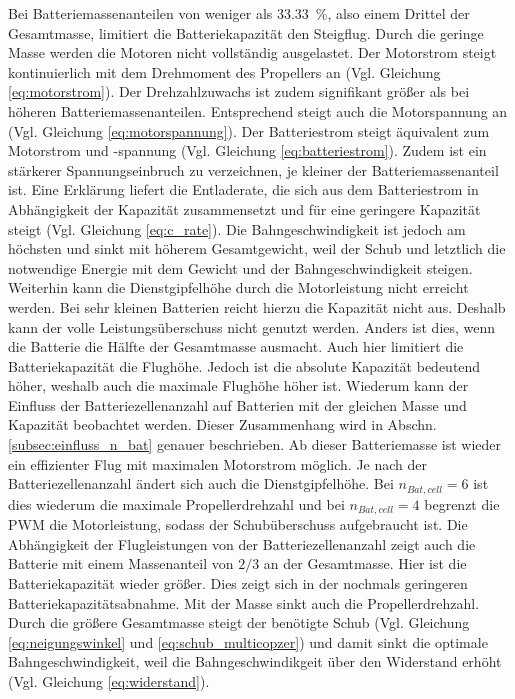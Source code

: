 Bei Batteriemassenanteilen von weniger als \SI{33,33}{\%}, also einem Drittel der Gesamtmasse, limitiert die Batteriekapazität den Steigflug. Durch die geringe Masse werden die Motoren nicht vollständig ausgelastet. Der Motorstrom steigt kontinuierlich mit dem Drehmoment des Propellers an (Vgl. Gleichung \ref{eq:motorstrom}). Der Drehzahlzuwachs ist zudem signifikant größer als bei höheren Batteriemassenanteilen. Entsprechend steigt auch die Motorspannung an (Vgl. Gleichung \ref{eq:motorspannung}). Der Batteriestrom steigt äquivalent zum Motorstrom und -spannung (Vgl. Gleichung \ref{eq:batteriestrom}).
Zudem ist ein stärkerer Spannungseinbruch zu verzeichnen, je kleiner der Batteriemassenanteil ist. Eine Erklärung liefert die Entladerate, die sich aus dem Batteriestrom in Abhängigkeit der Kapazität zusammensetzt und für eine geringere Kapazität steigt (Vgl. Gleichung \ref{eq:c_rate}). Die Bahngeschwindigkeit ist jedoch am höchsten und sinkt mit höherem Gesamtgewicht, weil der Schub und letztlich die notwendige Energie mit dem Gewicht und der Bahngeschwindigkeit steigen. 
Weiterhin kann die Dienstgipfelhöhe durch die Motorleistung nicht erreicht werden. Bei sehr kleinen Batterien reicht hierzu die Kapazität nicht aus. Deshalb kann der volle Leistungsüberschuss nicht genutzt werden. 
Anders ist dies, wenn die Batterie die Hälfte der Gesamtmasse ausmacht. Auch hier limitiert die Batteriekapazität die Flughöhe. Jedoch ist die absolute Kapazität bedeutend höher, weshalb auch die maximale Flughöhe höher ist. Wiederum kann der Einfluss der Batteriezellenanzahl auf Batterien mit der gleichen Masse und Kapazität beobachtet werden. Dieser Zusammenhang wird in Abschn. \ref{subsec:einfluss_n_bat} genauer beschrieben. Ab dieser Batteriemasse ist wieder ein effizienter Flug mit maximalen Motorstrom möglich. Je nach der Batteriezellenanzahl ändert sich auch die Dienstgipfelhöhe. Bei \ensuremath{n_{Bat,cell} = 6} ist dies wiederum die maximale Propellerdrehzahl und bei \ensuremath{n_{Bat,cell} = 4} begrenzt die PWM die Motorleistung, sodass der Schubüberschuss aufgebraucht ist. Die Abhängigkeit der Flugleistungen von der Batteriezellenanzahl zeigt auch die Batterie mit einem Massenanteil von \ensuremath{2/3} an der Gesamtmasse. Hier ist die Batteriekapazität wieder größer. Dies zeigt sich in der nochmals geringeren Batteriekapazitätsabnahme. Mit der Masse sinkt auch die Propellerdrehzahl. Durch die größere Gesamtmasse steigt der benötigte Schub (Vgl. Gleichung \ref{eq:neigungswinkel} und \ref{eq:schub_multicopzer}) und damit sinkt die optimale Bahngeschwindigkeit, weil die Bahngeschwindikgeit über den Widerstand erhöht (Vgl. Gleichung \ref{eq:widerstand}).
